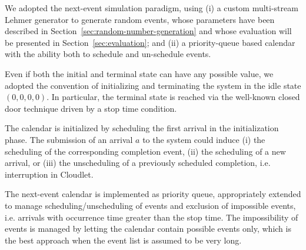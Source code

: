 We adopted the next-event simulation paradigm, using 
(i) a custom multi-stream Lehmer generator to generate random events, whose parameters have been described in Section~\ref{sec:random-number-generation} and whose evaluation will be presented in Section~\ref{sec:evaluation}; and
(ii) a priority-queue based calendar with the ability both to schedule and un-schedule events.

Even if both the initial and terminal state can have any possible value, we adopted the convention of initializing and terminating the system in the idle state $(0,0,0,0)$. In particular, the terminal state is reached via the well-known closed door technique driven by a stop time condition.

The calendar is initialized by scheduling the first arrival in the initialization phase. The submission of an arrival $a$ to the system could induce
(i) the scheduling of the corresponding completion event,
(ii) the scheduling of a new arrival, or
(iii) the unscheduling of a previously scheduled completion, i.e. interruption in Cloudlet.

The next-event calendar is implemented as priority queue, appropriately extended to manage scheduling/unscheduling of events and exclusion of impossible events, i.e. arrivals with occurrence time greater than the stop time.
The impossibility of events is managed by letting the calendar contain possible events only, which is the best approach when the event list is assumed to be very long.


